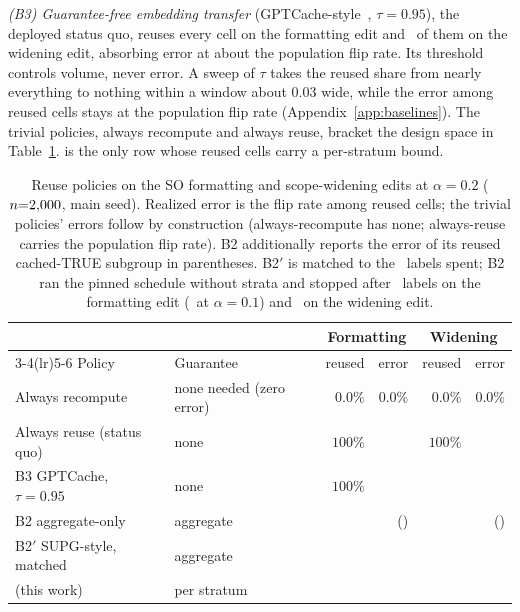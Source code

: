 \emph{(B3) Guarantee-free embedding transfer}
(GPTCache-style~\cite{gptcache}, $\tau{=}0.95$), the deployed status
quo, reuses every cell on the formatting edit and \bThreeReuseW\ of
them on the widening edit, absorbing error at about the population flip
rate. Its threshold controls volume, never error. A sweep of $\tau$
takes the reused share from nearly everything to nothing within a
window about $0.03$ wide, while the error among reused cells stays at the population
flip rate (Appendix~\ref{app:baselines}). The trivial policies, always
recompute and always reuse, bracket the design space in
Table~\ref{tab:policies}. \sivm{} is the only row whose reused cells
carry a per-stratum bound.

\begin{table}[t]
\caption{Reuse policies on the SO formatting and scope-widening edits at
$\alpha{=}0.2$ ($n{=}2{,}000$, main seed). Realized error is the flip rate
among reused cells; the trivial policies' errors follow by construction
(always-recompute has none; always-reuse carries the population flip rate). B2 additionally reports
the error of its reused cached-TRUE subgroup in parentheses. B2$'$ is
matched to the \hhBudget\ labels \sivm{} spent; B2 ran the pinned
schedule without strata and stopped after \aggFsampled\ labels on the
formatting edit (\aggFtSampled\ at $\alpha{=}0.1$) and \aggWsampled\
on the widening edit.}
\label{tab:policies}
\centering\small
\begin{tabular}{@{}llrrrr@{}}
\toprule
 & & \multicolumn{2}{c}{Formatting} & \multicolumn{2}{c}{Widening} \\
\cmidrule(lr){3-4}\cmidrule(lr){5-6}
Policy & Guarantee & reused & error & reused & error \\
\midrule
Always recompute & none needed (zero error) & $0.0\%$ & $0.0\%$ & $0.0\%$ & $0.0\%$ \\
Always reuse (status quo) & none & $100\%$ & \flipSoFormatting & $100\%$ & \flipSoWidening \\
B3 GPTCache, $\tau{=}0.95$ & none & $100\%$ & \flipSoFormatting & \bThreeReuseW & \bThreeErrW \\
B2 aggregate-only & aggregate & \aggFsavings & \aggFrealized\ (\aggFsubgroup) & \aggWsavings & \aggWrealized\ (\aggWsubgroup) \\
B2$'$ SUPG-style, matched & aggregate & \hhSupgReusedFrac & \hhSupgErr & \hhSupgReusedFracW & \hhSupgErrW \\
\sivm{} (this work) & per stratum & \hhSivmReusedFrac & \hhSivmErr & \hhSivmReusedFracW & \hhSivmErrW \\
\bottomrule
\end{tabular}
\end{table}

